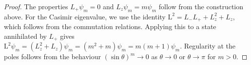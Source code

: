 \documentclass[10pt,a4paper]{amsart}
\begin{document}
\begin{proof}
The properties $L_+ \psi_m = 0$ and $L_z \psi_m = m\psi_m$ follow from the construction above. For the Casimir eigenvalue, we use the identity $\mathrm{L}^2 = L_- L_+ + L_z^2 + L_z$, which follows from the commutation relations. Applying this to a state annihilated by $L_+$ gives $\mathrm{L}^2 \psi_m = (L_z^2 + L_z)\psi_m = (m^2 + m)\psi_m = m(m+1)\psi_m$. Regularity at the poles follows from the behaviour $(\sin\theta)^m \to 0$ as $\theta \to 0$ or $\theta \to \pi$ for $m > 0$.
\end{proof}
\end{document}
